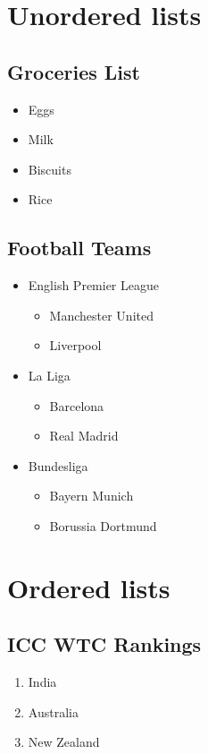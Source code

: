 \documentclass[6pt,a4paper]{report}
\begin{document}
	\begin{small}
		\section*{Unordered lists}
		
		\subsection*{Groceries List}
		\begin{itemize}
			\item Eggs
			\item Milk
			\item Biscuits
			\item Rice
		\end{itemize}	
		
		\subsection*{Football Teams}
		
		\begin{itemize}
			\item English Premier League
			\begin{itemize}
				\item Manchester United
				\item Liverpool
			\end{itemize}
			
			\item La Liga
			\begin{itemize}
				\item Barcelona
				\item Real Madrid
			\end{itemize}	
			
			\item Bundesliga
			\begin{itemize}
				\item Bayern Munich
				\item Borussia Dortmund
			\end{itemize}	
		\end{itemize}
		
		\section*{Ordered lists}
		\subsection*{ICC WTC Rankings}
		\begin{enumerate}
			\item India
			\item Australia
			\item New Zealand
		\end{enumerate}
		

\end{small}
\end{document}
